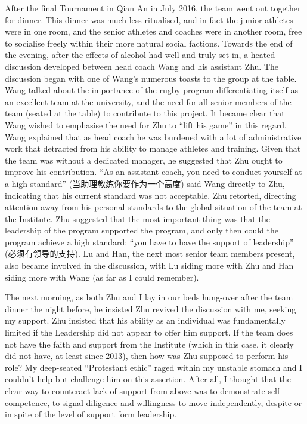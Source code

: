   After the final Tournament in Qian An in July 2016, the team went out together for dinner.  This dinner was much less ritualised, and in fact the junior athletes were in one room, and the senior athletes and coaches were in another room, free to socialise freely within their more natural social factions.  Towards the end of the evening, after the effects of alcohol had well and truly set in, a heated discussion developed between head coach Wang and his assistant Zhu. The discussion began with one of Wang's numerous toasts to the group at the table. Wang talked about the importance of the rugby program differentiating itself as an excellent team at the university, and the need for all senior members of the team (seated at the table) to contribute to this project.  It became clear that Wang wished to emphasise the need for Zhu to ``lift his game'' in this regard. Wang explained that as head coach he was burdened with a lot of administrative work that detracted from his ability to manage athletes and training.  Given that the team was without a dedicated manager, he suggested that Zhu ought to improve his contribution. ``As an assistant coach, you need to conduct yourself at a high standard'' (当助理教练你要作为一个高度) said Wang directly to Zhu, indicating that his current standard was not acceptable.  Zhu retorted, directing attention away from his personal standards to the global situation of the team at the Institute.  Zhu suggested that the most important thing was that the leadership of the program supported the program, and only then could the program achieve a high standard: ``you have to have the support of leadership'' (必须有领导的支持).  Lu and Han, the next most senior team members present, also became involved in the discussion, with Lu siding more with Zhu and Han siding more with Wang (as far as I could remember).

  The next morning, as both Zhu and I lay in our beds hung-over after the team dinner the night before, he insisted Zhu revived the discussion with me, seeking my support.   Zhu insisted that his ability as an individual was fundamentally limited if the Leadership did not appear to offer him support.  If the team does not have the faith and support from the Institute (which in this case, it clearly did not have, at least since 2013), then how was Zhu supposed to perform his role? My deep-seated ``Protestant ethic'' raged within my unstable stomach and I couldn't help but challenge him on this assertion.  After all, I thought that the clear way to counteract lack of support from above was to demonstrate self-competence, to signal diligence and willingness to move independently, despite or in spite of the level of support form leadership.


